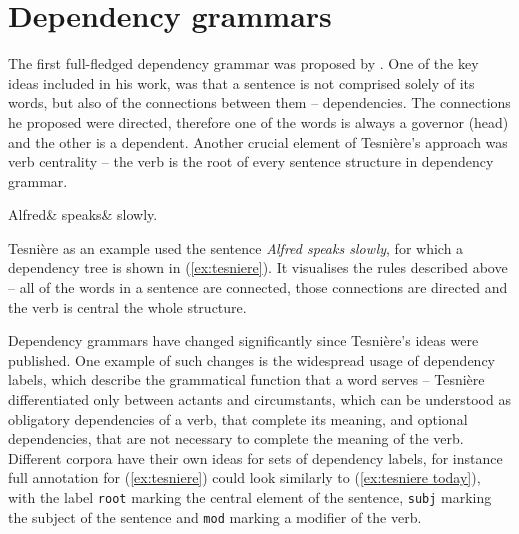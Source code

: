 \section{Dependency grammars}
The first full-fledged dependency grammar was proposed by \cite{tesniere}. One of the key ideas included in his work, was that a sentence is not comprised solely of its words, but also of the connections between them -- dependencies. The connections he proposed were directed, therefore one of the words is always a governor (head) and the other is a dependent. Another crucial element of Tesnière's approach was verb centrality -- the verb is the root of every sentence structure in dependency grammar. 

\begin{center}
\begin{exe}
	\ex
	\label{ex:tesniere}
    \begin{dependency}[theme = simple, baseline=-\the\dimexpr\fontdimen22\textfont2\relax]
    \begin{deptext}
        Alfred\& speaks\& slowly.\\
    \end{deptext}
    \end{dependency}
\end{exe}
\end{center}

Tesnière as an example used the sentence \textsl{Alfred speaks slowly}, for which a dependency tree is shown in (\ref{ex:tesniere}). It visualises the rules described above -- all of the words in a sentence are connected, those connections are directed and the verb is central the whole structure. 

Dependency grammars have changed significantly since Tesnière's ideas were published. One example of such changes is the widespread usage of dependency labels, which describe the grammatical function that a word serves -- Tesnière differentiated only between actants and circumstants, which can be understood as obligatory dependencies of a verb, that complete its meaning, and optional dependencies, that are not necessary to complete the meaning of the verb. Different corpora have their own ideas for sets of dependency labels, for instance full annotation for (\ref{ex:tesniere}) could look similarly to (\ref{ex:tesniere today}), with the label \texttt{root} marking the central element of the sentence, \texttt{subj} marking the subject of the sentence and \texttt{mod} marking a modifier of the verb.

